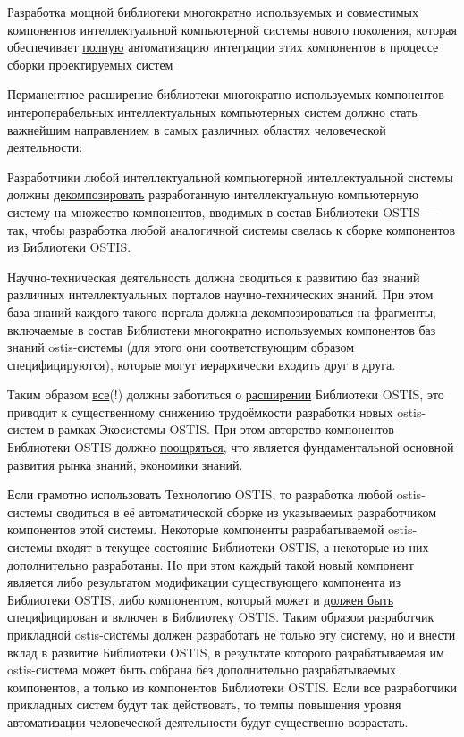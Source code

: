 \begin{textitemize}
	\item Разработка мощной библиотеки многократно используемых и совместимых компонентов интеллектуальной компьютерной системы нового поколения, которая обеспечивает \uline{полную} автоматизацию интеграции этих компонентов в процессе сборки проектируемых систем
	\item Перманентное расширение библиотеки многократно используемых компонентов интероперабельных интеллектуальных компьютерных систем должно стать важнейшим направлением в самых различных областях человеческой деятельности:
	\begin{textitemize}
		\item Разработчики любой интеллектуальной компьютерной интеллектуальной системы должны \uline{декомпозировать} разработанную интеллектуальную компьютерную систему на множество компонентов, вводимых в состав Библиотеки OSTIS --- так, чтобы разработка любой аналогичной системы свелась к сборке компонентов из Библиотеки OSTIS.
		\item Научно-техническая деятельность должна сводиться к развитию баз знаний различных интеллектуальных порталов научно-технических знаний. При этом база знаний каждого такого портала должна декомпозироваться на фрагменты, включаемые в состав Библиотеки многократно используемых компонентов баз знаний ostis-системы (для этого они соответствующим образом специфицируются), которые могут иерархически входить друг в друга.
		\item Таким образом \uline{все}(!) должны заботиться о \uline{расширении} Библиотеки OSTIS, это приводит к существенному снижению трудоёмкости разработки новых ostis-систем в рамках Экосистемы OSTIS. При этом авторство компонентов Библиотеки OSTIS должно \uline{поощряться}, что является фундаментальной основной развития рынка знаний, экономики знаний.  
	\end{textitemize}
\end{textitemize}

Если грамотно использовать Технологию OSTIS, то разработка любой ostis-системы сводиться в её автоматической сборке из указываемых разработчиком компонентов этой системы. Некоторые компоненты разрабатываемой ostis-системы входят в текущее состояние Библиотеки OSTIS, а некоторые из них дополнительно разработаны. Но при этом каждый такой новый компонент является либо результатом модификации существующего компонента из Библиотеки OSTIS, либо компонентом, который может и \uline{должен быть} специфицирован и включен в Библиотеку OSTIS. Таким образом разработчик прикладной ostis-системы должен разработать не только эту систему, но и внести вклад в развитие Библиотеки OSTIS, в результате которого разрабатываемая им ostis-система может быть собрана без дополнительно разрабатываемых компонентов, а только из компонентов Библиотеки OSTIS. Если все разработчики прикладных систем будут так действовать, то темпы повышения уровня автоматизации человеческой деятельности будут существенно возрастать.

